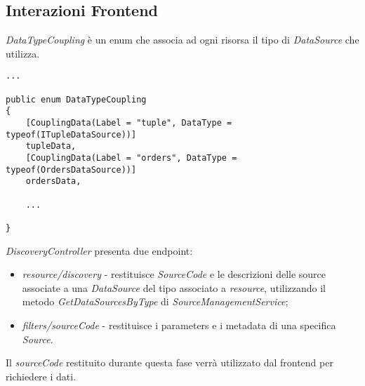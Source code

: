 \subsection{Interazioni Frontend}
\label{chap:frontend}
\textit{DataTypeCoupling} è un enum che associa ad ogni risorsa il tipo di \textit{DataSource} che utilizza.
\begin{lstlisting}[caption={DataTypeCoupling.cs}, style=sharpCode]
...

public enum DataTypeCoupling
{
    [CouplingData(Label = "tuple", DataType = typeof(ITupleDataSource))]
    tupleData,
    [CouplingData(Label = "orders", DataType = typeof(OrdersDataSource))]
    ordersData,

    ... 

}
\end{lstlisting}
\newpage
\textit{DiscoveryController} presenta due endpoint:
\begin{itemize}
\item \textit{{resource}/discovery} - restituisce \textit{SourceCode} e le descrizioni delle source associate a una \textit{DataSource} del tipo associato a \textit{resource}, utilizzando il metodo \textit{GetDataSourcesByType} di \textit{SourceManagementService};
\item \textit{filters/{sourceCode}} - restituisce i parameters e i metadata di una specifica \textit{Source}.
\end{itemize}
Il \textit{sourceCode} restituito durante questa fase verrà utilizzato dal frontend per richiedere i dati.

